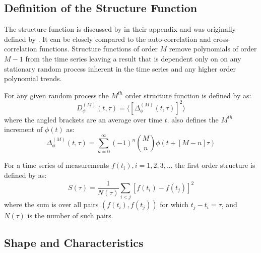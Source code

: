 \documentclass[12pt, oneside]{smuthesis}
\begin{document}
\subsection{\sc Definition of the Structure Function} \label{structureFunctionDefinition}

The structure function is discussed by \citep{cordes1985} in their appendix and was originally defined by \citep{rutman}. It can be closely compared to the auto-correlation and cross-correlation functions. Structure functions of order $M$ remove polynomials of order $M-1$ from the time series leaving a result that is dependent only on on any stationary random process inherent in the time series and any higher order polynomial trends.

For any given random process the $M^{th}$ order structure function is defined by \cite{rutman} as:
\begin{equation} \label{eqn3.1}
D^{\left(M\right)}_{\phi}\left(t, \tau\right) = \langle\left[\Delta^{\left(M\right)}_{\phi}\left(t, \tau\right)\right]^{2}\rangle
\end{equation}
where the angled brackets are an average over time $t$. \cite{rutman} also defines the $M^{th}$ increment of $\phi\left(t\right)$ as:
\begin{equation} \label{eqn3.2}
\Delta^{\left(M\right)}_{\phi}\left(t, \tau\right) = \sum_{n=0}^{\infty}\left(-1\right)^{n}{M \choose n}\phi\left(t + \left[M - n\right]\tau\right)
\end{equation}

For a time series of measurements $f\left(t_{i}\right), i = 1,2,3,...$ the first order structure is defined by \citep{collier2001} as:
\begin{equation}
S\left(\tau\right) = \frac{1}{N\left(\tau\right)}\sum_{i<j}\left[f\left(t_{i}\right)-f\left(t_{j}\right)\right]^{2}
\end{equation}
where the sum is over all pairs $\left(f\left(t_{i}\right),f\left(t_{j}\right)\right)$ for which $t_{j}-t_{i}=\tau$, and $N\left(\tau\right)$ is the number of such pairs.

\subsection{\sc Shape and Characteristics} \label{shapeAndCharacteristics}
\end{document}
